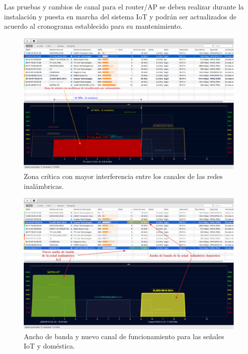 Las pruebas y cambios de canal para el router/AP se deben realizar durante la instalación y puesta en marcha del sistema IoT y podrán ser actualizados de acuerdo al cronograma establecido para su mantenimiento. 



\begin{landscape} %
\begin{figure}[htpb]
\centering 
\includegraphics[width=1.5\textwidth]{./Figures/wifi/04.png}
\caption{Zona crítica con mayor interferencia entre los canales de las redes inalámbricas.}
\label{fig:test04}
\end{figure}
\end{landscape} %



\begin{landscape} %
\begin{figure}[htpb]
\centering 
\includegraphics[width=1.5\textwidth]{./Figures/wifi/05.png}
\caption{Ancho de banda y nuevo canal de funcionamiento para las señales IoT y doméstica.}
\label{fig:test05}
\end{figure}
\end{landscape} %


